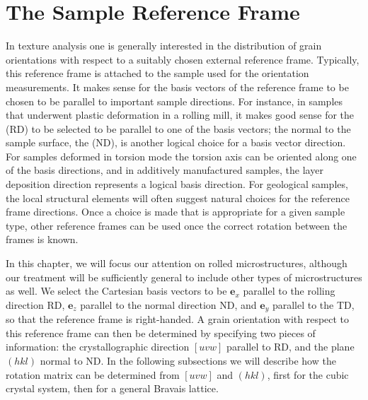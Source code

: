 \section{The Sample Reference  Frame}\label{\chabbr:sec:sampleref}
In texture analysis one is generally interested in the distribution of grain orientations with respect to a suitably chosen external reference frame.  Typically, this reference frame is attached to the sample used for the orientation measurements. It makes sense for the basis vectors of the reference frame to be chosen to be parallel to important sample directions.  For instance, in samples that underwent plastic deformation in a rolling mill, it makes good sense for the  (RD) to be selected to be parallel to one of the basis vectors; the normal to the sample surface, the  (ND), is another logical choice for a basis vector direction.  For samples deformed in torsion mode the torsion axis can be oriented along one of the basis directions, and in additively manufactured samples, the layer deposition direction represents a logical basis direction. For geological samples, the local structural elements will often suggest natural choices for the reference frame directions.  Once a choice is made that is appropriate for a given sample type, other reference frames can be used once the correct rotation between the frames is known.

In this chapter, we will focus our attention on rolled microstructures, although our treatment will be sufficiently general to include other types of microstructures as well. We select the Cartesian basis vectors to be $\mathbf{e}_x$ parallel to the rolling direction RD, $\mathbf{e}_z$ parallel to the normal direction ND, and $\mathbf{e}_y$ parallel to the  TD, so that the reference frame is right-handed.  A grain orientation with respect to this reference frame can then be determined by specifying two pieces of information: the crystallographic direction $[uvw]$ parallel to RD, and the plane $(hkl)$ normal to ND.  In the following subsections we will describe how the rotation matrix can be determined from $[uvw]$ and $(hkl)$, first for the cubic crystal system, then for a general Bravais lattice.

